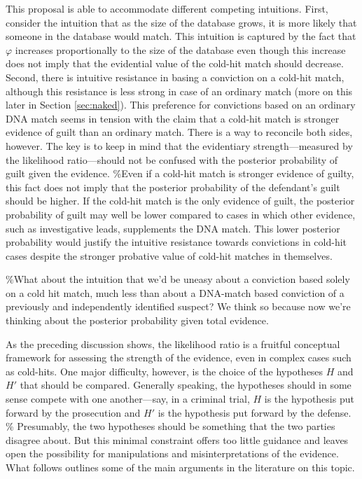 \documentclass[10pt,dvipsnames,enabledeprecatedfontcommands]{scrartcl}
\begin{document}
This proposal is able to accommodate different competing intuitions.
First, consider the intuition that as the size of the database grows, it
is more likely that someone in the database would match. This intuition
is captured by the fact that \(\varphi\) increases proportionally to the
size of the database even though this increase does not imply that the
evidential value of the cold-hit match should decrease. Second, there is
intuitive resistance in basing a conviction on a cold-hit match,
although this resistance is less strong in case of an ordinary match
(more on this later in Section \ref{sec:naked}). This preference for
convictions based on an ordinary DNA match seems in tension with the
claim that a cold-hit match is stronger evidence of guilt than an
ordinary match. There is a way to reconcile both sides, however. The key
is to keep in mind that the evidentiary strength---measured by the
likelihood ratio---should not be confused with the posterior probability
of guilt given the evidence. \%Even if a cold-hit match is stronger
evidence of guilty, this fact does not imply that the posterior
probability of the defendant's guilt should be higher. If the cold-hit
match is the only evidence of guilt, the posterior probability of guilt
may well be lower compared to cases in which other evidence, such as
investigative leads, supplements the DNA match. This lower posterior
probability would justify the intuitive resistance towards convictions
in cold-hit cases despite the stronger probative value of cold-hit
matches in themselves.

\%What about the intuition that we'd be uneasy about a conviction based
solely on a cold hit match, much less than about a DNA-match based
conviction of a previously and independently identified suspect? We
think so because now we're thinking about the posterior probability
given total evidence.

As the preceding discussion shows, the likelihood ratio is a fruitful
conceptual framework for assessing the strength of the evidence, even in
complex cases such as cold-hits. One major difficulty, however, is the
choice of the hypotheses \(H\) and \(H'\) that should be compared.
Generally speaking, the hypotheses should in some sense compete with one
another---say, in a criminal trial, \(H\) is the hypothesis put forward
by the prosecution and \(H'\) is the hypothesis put forward by the
defense. \% Presumably, the
two hypotheses should be something that the two parties disagree about.
But this minimal constraint offers too little guidance and leaves open
the possibility for manipulations and misinterpretations of the
evidence. What follows outlines some of the main arguments in the
literature on this topic.
\end{document}
